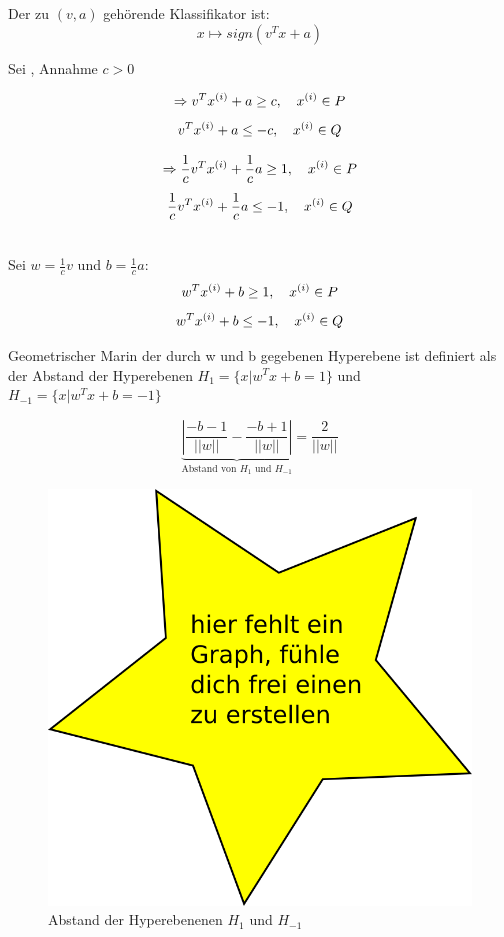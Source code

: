 		Der zu $ (v,a) $ gehörende Klassifikator ist:
		\[ x \longmapsto sign(v^Tx + a) \]
		
		Sei , Annahme $ c > 0   $\\
		
		\begin{minipage}[]{0.45\linewidth}
			
			\[\Rightarrow v^Tx^{(i)} + a \geq c, \quad x^{(i)} \in P\]
			\[v^Tx^{(i)} + a \leq -c, \quad x^{(i)} \in Q\]
		\end{minipage}
		\hfill
		\begin{minipage}[]{0.45\linewidth}
			\[\Rightarrow \frac{1}{c}v^Tx^{(i)} + \frac{1}{c}a \geq 1, \quad x^{(i)} \in P\]
			\[\frac{1}{c}v^Tx^{(i)} + \frac{1}{c}a \leq -1, \quad x^{(i)} \in Q\]			
		\end{minipage}\\
		
		
		Sei $ w = \frac{1}{c}v $ und $ b = \frac{1}{c} a $:\\
		
		\[ w^Tx^{(i)} + b \geq 1, \quad x^{(i)} \in P\]
		\[ w^Tx^{(i)} + b \leq -1, \quad x^{(i)} \in Q\]
		
		Geometrischer Marin der durch w und b gegebenen Hyperebene ist definiert als der Abstand der Hyperebenen $ H_1 = \{ x | w^Tx + b = 1 \} $ und $ H_{-1} = \{ x | w^Tx + b = - 1 \} $
		
		\begin{figure}[H]
			\centering
			\begin{minipage}[]{0.45\linewidth}
				\[ \underset{\text{Abstand von } H_1 \text{ und } H_{-1} }{\underbrace{|\frac{-b -1}{||w||} - \frac{-b + 1}{||w||} |}} = \frac{2}{||w||} \]
			\end{minipage}
			\hfill
			\begin{minipage}[]{0.45\linewidth}
				\centering
				\includegraphics[width=.75\linewidth]{graphs/dummy}
				\caption{Abstand der Hyperebenenen $ H_1 $ und $ H_{-1} $}
			\end{minipage}%
		\end{figure}
		
